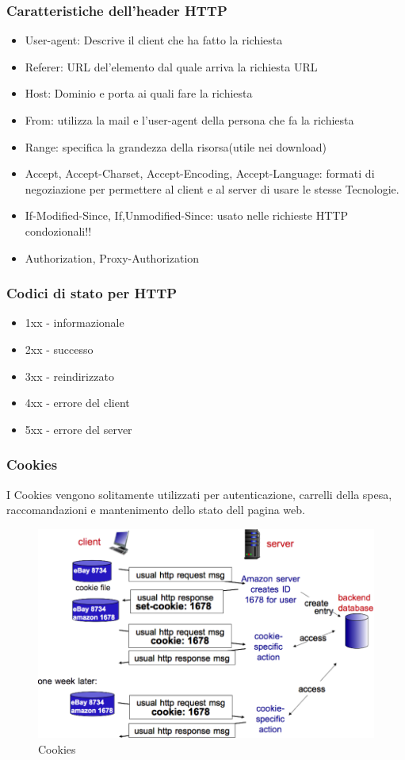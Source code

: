 \subsubsection{Caratteristiche dell'header HTTP}
\begin{itemize}
    \item User-agent: Descrive il client che ha fatto la richiesta
    \item Referer: URL del'elemento dal quale arriva la richiesta URL
    \item Host: Dominio e porta ai quali fare la richiesta
    \item From: utilizza la mail e l'user-agent della persona che fa la richiesta
    \item Range: specifica la grandezza della risorsa(utile nei download)
    \item Accept, Accept-Charset, Accept-Encoding, Accept-Language: formati di negoziazione per permettere al client e al server di usare le stesse Tecnologie.
    \item If-Modified-Since, If,Unmodified-Since: usato nelle richieste HTTP condozionali!!
    \item Authorization, Proxy-Authorization
\end{itemize}

\subsubsection{Codici di stato per HTTP}
\begin{itemize}
    \item 1xx - informazionale
    \item 2xx - successo
    \item 3xx - reindirizzato
    \item 4xx - errore del client
    \item 5xx - errore del server
\end{itemize}

\subsubsection{Cookies}
I Cookies vengono solitamente utilizzati per autenticazione, carrelli della spesa, raccomandazioni e mantenimento dello stato dell pagina web.


\begin{figure}[h!]
	\centering
	\includegraphics[width=0.6\linewidth]{imgs/1 - cookies.png}
	\caption{Cookies}
	\label{fig:Cookies}
\end{figure}

